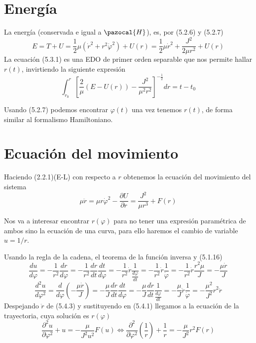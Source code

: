 \section{Energía} 
La energía (conservada e igual a $\pazocal{H}$), es, por (5.2.6) y (5.2.7)
\begin{equation} \label{5.1.22}
    E = T+U = \frac{1}{2}\mu\left(\dot{r}^2+r^2\dot{\varphi}^2\right)+U(r)=\frac{1}{2}\mu\dot{r}^2 + \frac{J^2}{2\mu r^2}+U(r)
\end{equation} 
La ecuación (5.3.1) es una EDO de primer orden separable que nos permite hallar $r(t)$, invirtiendo la siguiente expresión
\begin{equation} \label{5.1.23}
    \int_{r_0}^r{\left[\frac{2}{\mu}\left(E-U(r)\right)-\frac{J^2}{\mu^2 r^2}\right]^{-\frac{1}{2}}dr}=t-t_0
\end{equation} 

Usando (5.2.7) podemos encontrar $\varphi(t)$ una vez tenemos $r(t)$, de forma similar al formalismo Hamiltoniano.
\section{Ecuación del movimiento} 
Haciendo (2.2.1)(E-L) con respecto a $r$ obtenemos la ecuación del movimiento del sistema
\begin{equation} \label{5.1.24}
    \mu \ddot{r} = \mu r \dot{\varphi}^2 - \frac{\partial U}{\partial r} = \frac{J^2}{\mu r^3}+ F(r)
\end{equation} 

Nos va a interesar encontrar $r(\varphi)$ para no tener una expresión paramétrica de ambos sino la ecuación de una curva, para ello haremos el cambio de variable $u=1/r$.

Usando la regla de la cadena, el teorema de la función inversa y (5.1.16)
\begin{equation} \label{5.1.25}
    \frac{d u}{d\varphi}  = -\frac{1}{r^2} \frac{dr}{d\varphi} = -\frac{1}{r^2} \frac{dr}{dt} \frac{dt}{d\varphi}= -\frac{1}{r^2} \dot{r} \frac{1}{\frac{d\varphi}{dt}}=-\frac{1}{r^2} \dot{r} \frac{1}{\dot{\varphi}}= -\frac{1}{r^2} \dot{r} \frac{r^2 \mu}{J} = -\frac{\mu \dot{r}}{J}
\end{equation} 
\begin{equation} \label{5.1.26}
    \frac{d^2 u}{d\varphi^2}  = \frac{d}{d\varphi}\left(-\frac{\mu \dot{r}}{J}\right)=-\frac{\mu}{J} \frac{d \dot{r}}{dt} \frac{dt}{d\varphi} = -\frac{\mu}{J} \frac{d \dot{r}}{dt} \frac{1}{\frac{d\varphi}{dt}} = -\frac{\mu}{J} \ddot{r} \frac{1}{\dot{\varphi}}= - \frac{\mu^2}{J^2} r^2 \ddot{r}
\end{equation} 
Despejando $\ddot{r}$ de (5.4.3) y sustituyendo en (5.4.1) llegamos a la ecuación de la trayectoria, cuya solución es $r(\varphi)$
\begin{equation} \label{5.1.27}
    \frac{\partial^2 u}{\partial \varphi^2} + u = -\frac{\mu}{J^2 u^2}F(u) \iff \frac{\partial^2}{\partial \varphi^2}\left(\frac{1}{r}\right) + \frac{1}{r} = -\frac{\mu}{J^2}r^2F(r)
\end{equation} 

